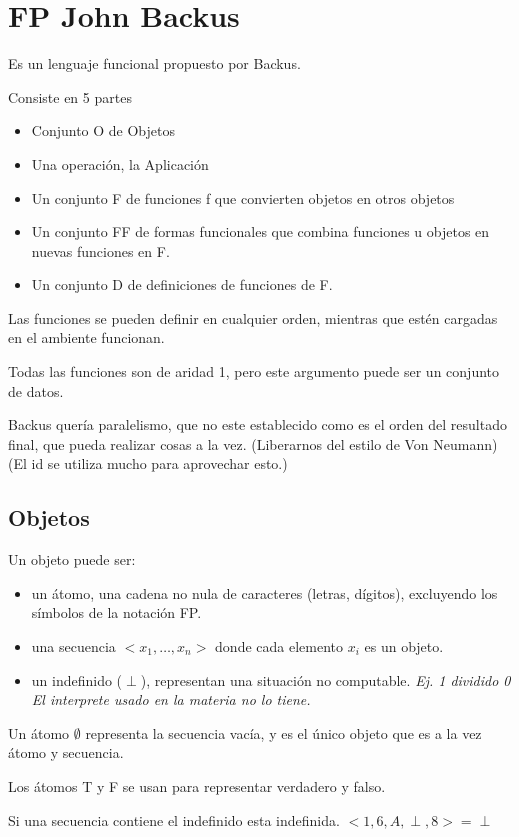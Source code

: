 \section{FP John Backus}
Es un lenguaje funcional propuesto por Backus.

Consiste en 5 partes
\begin{itemize}
\item Conjunto O de Objetos
\item Una operación, la Aplicación
\item Un conjunto F de funciones  f que convierten objetos en otros objetos
\item Un conjunto FF de formas funcionales que combina funciones u objetos en nuevas funciones en F.
\item Un conjunto D de definiciones de funciones de F.
\end{itemize}


Las funciones se pueden definir en cualquier orden, mientras que estén cargadas en el ambiente funcionan.

Todas las funciones son de aridad 1, pero este argumento puede ser un conjunto de datos.

Backus quería paralelismo, que no este establecido como es el orden del resultado final, que pueda realizar cosas a la vez. (Liberarnos del estilo de Von Neumann) (El id se utiliza mucho para aprovechar esto.)

\subsection*{Objetos}
Un objeto puede ser:
\begin{itemize}
\item un átomo, una cadena no nula de caracteres (letras, dígitos), excluyendo los símbolos de la notación FP.
\item una secuencia $<x_1,\ldots,x_n>$ donde cada elemento $x_i$ es un objeto.
\item un indefinido ($ \perp $), representan una situación no computable. \textit{Ej. 1 dividido 0} \textit{El interprete usado en la materia no lo tiene.}
\end{itemize}


Un átomo $\emptyset$ representa la secuencia vacía, y es el único objeto que es a la vez átomo y secuencia.

Los átomos T y F se usan para representar verdadero y falso.

Si una secuencia contiene el indefinido esta indefinida. $<1,6, A,\perp ,8> = \perp$

